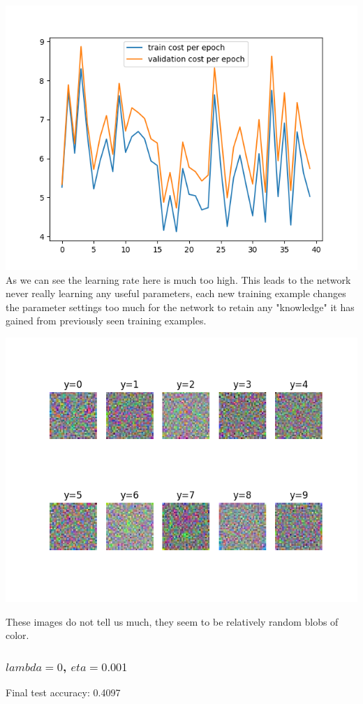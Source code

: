 \documentclass[11pt,a4paper]{article}
\begin{document}
\includegraphics[width=\textwidth]{eta_0.1_lambda_0.png}
As we can see the learning rate here is much too high. This leads to the network never really learning any useful parameters, each new training example changes the parameter settings too much for the network to retain any "knowledge" it has gained from previously seen training examples.

\includegraphics[width=\textwidth]{eta_0.1_lambda_0_montage.png}

These images do not tell us much, they seem to be relatively random blobs of color.


\subsubsection{$lambda=0$, $eta=0.001$}
Final test accuracy: 0.4097
\end{document}
